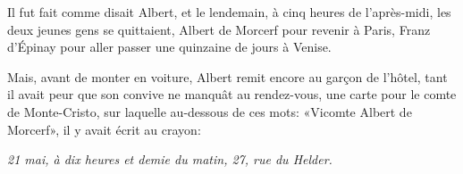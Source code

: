 Il fut fait comme disait Albert, et le lendemain, à cinq heures de l'après-midi, les deux jeunes gens se quittaient, Albert de Morcerf pour revenir à Paris, Franz d'Épinay pour aller passer une quinzaine de jours à Venise. 

Mais, avant de monter en voiture, Albert remit encore au garçon de l'hôtel, tant il avait peur que son convive ne manquât au rendez-vous, une carte pour le comte de Monte-Cristo, sur laquelle au-dessous de ces mots: «Vicomte Albert de Morcerf», il y avait écrit au crayon: 

\textit{21 mai, à dix heures et demie du matin, 27, rue du Helder.} 